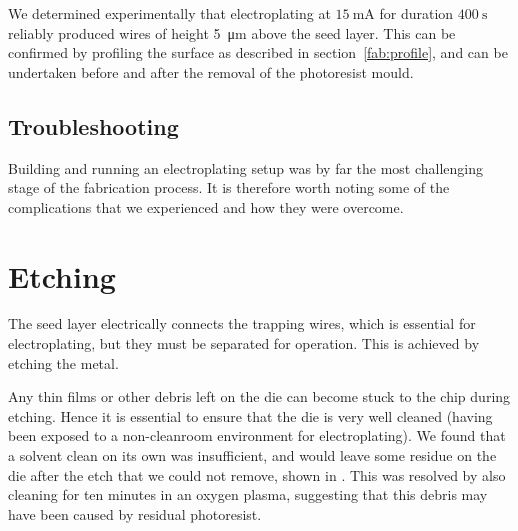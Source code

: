 We determined experimentally that electroplating at $\SI{15}{\milli\ampere}$
for duration $\SI{400}{\second}$ reliably produced wires of height
\SI{5}{\micro\meter} above the seed layer. This can be confirmed by profiling
the surface as described in section~\ref{fab:profile}, and can be undertaken
before and after the removal of the photoresist mould. 
%

\subsection{Troubleshooting}

Building and running an electroplating setup was by far the most challenging
stage of the fabrication process. It is therefore worth noting some of the
complications that we experienced and how they were overcome.








\section{Etching}

The seed layer electrically connects the trapping wires, which is
essential for electroplating, but they must be separated for operation. This is
achieved by etching the metal.

Any thin films or other debris left on the die can become stuck to the chip
during etching. \cite{} Hence it is essential to ensure that the die is very
well cleaned (having been exposed to a non-cleanroom environment for
electroplating). We found that a solvent clean on its own was insufficient,
and would leave some residue on the die after the etch that we could not
remove, shown in . This was resolved by also cleaning
for ten minutes in an oxygen plasma, suggesting that this debris may have been
caused by residual photoresist.

